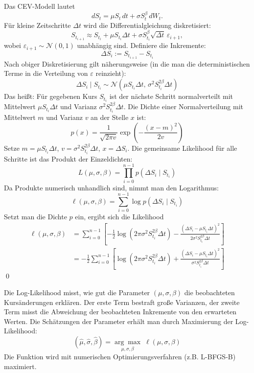 \begin{satz}
Das CEV-Modell lautet
$$
dS_t = \mu S_t\,dt + \sigma S_t^{\beta}\,dW_t.
$$
Für kleine Zeitschritte $\Delta t$ wird die Differentialgleichung diskretisiert:
$$
S_{t_{i+1}} \approx S_{t_i} + \mu S_{t_i} \Delta t + \sigma S_{t_i}^{\beta} \sqrt{\Delta t}\, \varepsilon_{i+1},
$$
wobei $\varepsilon_{i+1} \sim \mathcal N(0,1)$ unabhängig sind.
Definiere die Inkremente:
$$
\Delta S_i := S_{t_{i+1}} - S_{t_i}
$$
Nach obiger Diskretisierung gilt näherungsweise (in die man die deterministischen Terme in die Verteilung von $\varepsilon$ reinzieht):
$$
\Delta S_i \mid S_{t_i} \sim \mathcal N\left(\mu S_{t_i} \Delta t,\, \sigma^2 S_{t_i}^{2\beta} \Delta t\right)
$$
Das heißt: Für gegebenen Kurs $S_{t_i}$ ist der nächste Schritt normalverteilt mit 
Mittelwert $\mu S_{t_i} \Delta t$ und Varianz $\sigma^2 S_{t_i}^{2\beta} \Delta t$.
Die Dichte einer Normalverteilung mit Mittelwert $m$ und Varianz $v$ an der Stelle $x$ ist:
$$
p(x) = \frac{1}{\sqrt{2\pi v}} \exp\left(-\frac{(x-m)^2}{2v}\right)
$$
Setze $m = \mu S_{t_i} \Delta t$, $v = \sigma^2 S_{t_i}^{2\beta} \Delta t$, $x = \Delta S_i$.
Die gemeinsame Likelihood für alle Schritte ist das Produkt der Einzeldichten:
$$
L(\mu, \sigma, \beta) = \prod_{i=0}^{n-1} p(\Delta S_i \mid S_{t_i})
$$
Da Produkte numerisch unhandlich sind, nimmt man den Logarithmus:
$$
\ell(\mu, \sigma, \beta) = \sum_{i=0}^{n-1} \log p(\Delta S_i \mid S_{t_i})
$$
Setzt man die Dichte $p$ ein, ergibt sich die Likelihood
\begin{align*}
\ell(\mu, \sigma, \beta) &= \sum_{i=0}^{n-1} \left[
    -\frac{1}{2} \log(2\pi \sigma^2 S_{t_i}^{2\beta} \Delta t)
    -\frac{(\Delta S_i - \mu S_{t_i} \Delta t)^2}{2 \sigma^2 S_{t_i}^{2\beta} \Delta t}
\right] \\
&= -\frac{1}{2} \sum_{i=0}^{n-1} \left[
    \log(2\pi \sigma^2 S_{t_i}^{2\beta} \Delta t)
    + \frac{(\Delta S_i - \mu S_{t_i} \Delta t)^2}{\sigma^2 S_{t_i}^{2\beta} \Delta t}
\right]
\end{align*} 
\qed
\end{satz}

\begin{bem}[Interpretation]
Die Log-Likelihood misst, wie gut die Parameter $(\mu, \sigma, \beta)$ die beobachteten Kursänderungen erklären. 
Der erste Term bestraft große Varianzen, der zweite Term misst die Abweichung der beobachteten Inkremente von den erwarteten Werten.
Die Schätzungen der Parameter erhält man durch Maximierung der Log-Likelihood:
$$
(\widehat{\mu}, \widehat{\sigma}, \widehat{\beta}) = \underset{\mu, \sigma, \beta}{\arg\max} \; \ell(\mu, \sigma, \beta)
$$
Die Funktion wird mit numerischen Optimierungsverfahren (z.B. L-BFGS-B) maximiert.
\end{bem}

